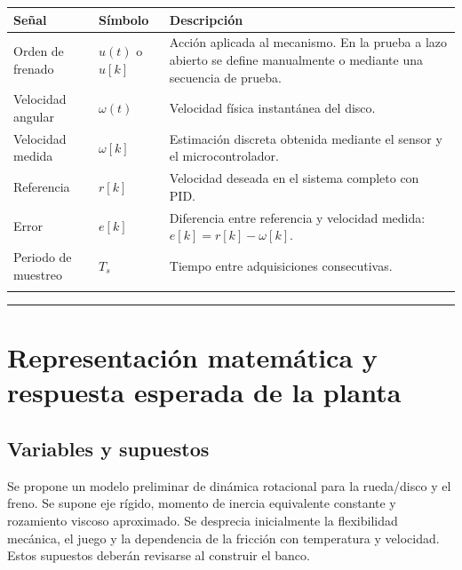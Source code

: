\documentclass[9pt,a4paper,twocolumn]{extarticle}
\renewcommand{\arraystretch}{1.08}
\begin{document}
\begin{center}\begingroup\setlength{\tabcolsep}{2pt}\renewcommand{\arraystretch}{1.15}\scriptsize
\begin{tabularx}{\columnwidth}{@{}YYY@{}}
\toprule
\textbf{Señal} & \textbf{Símbolo} & \textbf{Descripción}\\
\midrule
Orden de frenado & $u(t)$ o $u[k]$ & Acción aplicada al mecanismo. En la prueba a lazo abierto se define manualmente o mediante una secuencia de prueba.\\
\addlinespace[2pt]
Velocidad angular & $\omega(t)$ & Velocidad física instantánea del disco.\\
\addlinespace[2pt]
Velocidad medida & $\omega[k]$ & Estimación discreta obtenida mediante el sensor y el microcontrolador.\\
\addlinespace[2pt]
Referencia & $r[k]$ & Velocidad deseada en el sistema completo con PID.\\
\addlinespace[2pt]
Error & $e[k]$ & Diferencia entre referencia y velocidad medida: $e[k]=r[k]-\omega[k]$.\\
\addlinespace[2pt]
Periodo de muestreo & $T_s$ & Tiempo entre adquisiciones consecutivas.\\
\addlinespace[2pt]
\bottomrule
\end{tabularx}\endgroup\end{center}

\begin{center}\rule{0.5\linewidth}{0.5pt}\end{center}

\section{Representación matemática y respuesta esperada de la
planta}\label{modelo_teorico}

\subsection{Variables y supuestos}

Se propone un modelo preliminar de dinámica rotacional para la
rueda/disco y el freno. Se supone eje rígido, momento de inercia
equivalente constante y rozamiento viscoso aproximado. Se desprecia
inicialmente la flexibilidad mecánica, el juego y la dependencia de la
fricción con temperatura y velocidad. Estos supuestos deberán revisarse
al construir el banco.
\end{document}
